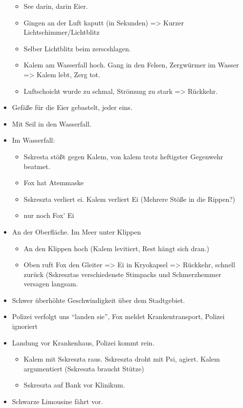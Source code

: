 \documentclass[11pt]{article}
\begin{document}
\begin{itemize}
  \begin{itemize}
  \item
    See darin, darin Eier.
  \item
    Gingen an der Luft kaputt (in Sekunden) =\textgreater{} Kurzer
    Lichtschimmer/Lichtblitz
  \item
    Selber Lichtblitz beim zerscshlagen.
  \item
    Kalem am Wasserfall hoch. Gang in den Felsen, Zergwürmer im Wasser
    =\textgreater{} Kalem lebt, Zerg tot.
  \item
    Luftschoicht wurde zu schmal, Strömung zu stark =\textgreater{}
    Rückkehr.
  \end{itemize}
\item
  Gefäße für die Eier gebastelt, jeder eins.
\item
  Mit Seil in den Wasserfall.
\item
  Im Wasserfall:

  \begin{itemize}
  \item
    Sskresta stößt gegen Kalem, von kalem trotz heftigster Gegenwehr
    beatmet.
  \item
    Fox hat Atemmaske
  \item
    Sskreszta verliert ei. Kalem verliert Ei (Mehrere Stöße in die
    Rippen?)
  \item
    nur noch Fox' Ei
  \end{itemize}
\item
  An der Oberfläche. Im Meer unter Klippen

  \begin{itemize}
  \item
    An den Klippen hoch (Kalem levitiert, Rest hängt sich dran.)
  \item
    Oben ruft Fox den Gleiter =\textgreater{} Ei in Kryokapsel
    =\textgreater{} Rückkehr, schnell zurück (Sskresztas verschiedenste
    Stimpacks und Schmerzhemmer versagen langsam.
  \end{itemize}
\item
  Schwer überhöhte Geschwindigkeit über dem Stadtgebiet.
\item
  Polizei verfolgt uns ``landen sie'', Fox meldet Krankentransport,
  Polizei ignoriert
\item
  Landung vor Krankenhaus, Polizei kommt rein.

  \begin{itemize}
  \item
    Kalem mit Sskreszta raus. Sskreszta droht mit Psi, agiert. Kalem
    argumentiert (Sskreszta braucht Stütze)
  \item
    Sskreszta auf Bank vor Klinikum.
  \end{itemize}
\item
  Schwarze Limousine fährt vor.


\end{itemize}
\end{document}
